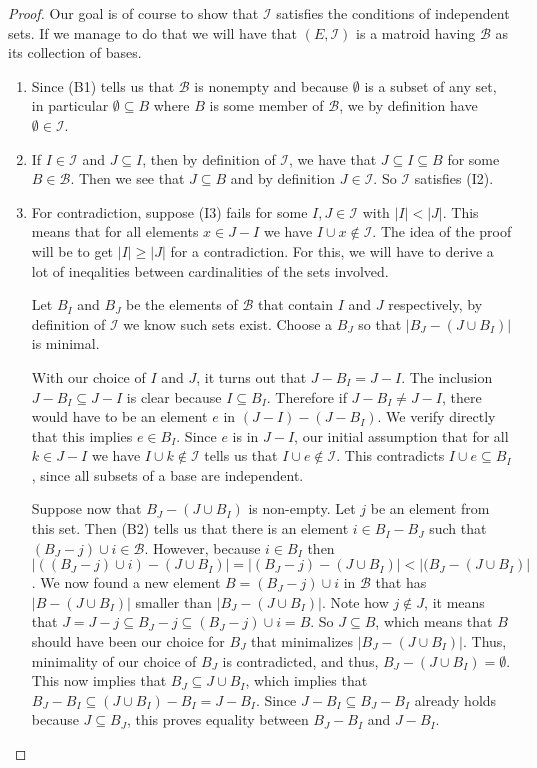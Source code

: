\begin{proof}
    Our goal is of course to show that $\mathcal{I}$ satisfies the conditions of independent sets. If we manage to do that we will have that $(E, \mathcal{I})$ is a matroid having $\mathcal{B}$ as its collection of bases.
    \begin{enumerate}
        \item Since (B1) tells us that $\mathcal{B}$ is nonempty and because $\emptyset$ is a subset of any set, in particular $\emptyset \subseteq B$ where $B$ is some member of $\mathcal{B}$, we by definition have $\emptyset \in \mathcal{I}$.
        
        \item If $I\in\mathcal{I}$ and $J\subseteq I$, then by definition of $\mathcal{I}$, we have that $J\subseteq I\subseteq B$ for some $B\in\mathcal{B}$. Then we see that $J\subseteq B$ and by definition  $J\in\mathcal{I}$. So $\mathcal{I}$ satisfies (I2).
        
        \item For contradiction, suppose (I3) fails for some $I,J\in\mathcal{I}$ with $|I|<|J|$. This means that for all elements $x\in J-I$ we have $I\cup x \notin \mathcal{I}$. The idea of the proof will be to get $|I|\geq|J|$ for a contradiction. For this, we will have to derive a lot of ineqalities between cardinalities of the sets involved.
        
        Let $B_I$ and $B_J$ be the elements of $\mathcal{B}$ that contain $I$ and $J$ respectively, by definition of $\mathcal{I}$ we know such sets exist. Choose a $B_J$ so that $|B_J - (J\cup B_I)|$ is minimal. 
    
        With our choice of $I$ and $J$, it turns out that $J-B_I = J-I$. 
        The inclusion $J- B_I \subseteq J - I$ is clear because $I \subseteq B_I$. Therefore if $J-B_I \neq J-I$, there would have to be an element $e$ in $(J-I)-(J-B_I)$. We verify directly that this implies $e \in B_I$. Since $e$ is in $J-I$, our initial assumption that for all $k \in J - I$ we have $I \cup k \notin \mathcal{I}$ tells us that $I\cup e\notin \mathcal{I}$. This contradicts $I\cup e\subseteq B_I$, since all subsets of a base are independent.

        Suppose now that $B_J-(J\cup B_I)$ is non-empty. Let $j$ be an element from this set. Then (B2) tells us that there is an element $i\in B_I-B_J$ such that $(B_J-j)\cup i \in\mathcal{B}$. However, because $i \in B_I$ then $|((B_J-j)\cup i)-(J\cup B_I)|=|(B_J-j)-(J\cup B_I)|<|(B_J-(J\cup B_I)|$. We now found a new element $B=(B_J-j)\cup i$ in $\mathcal{B}$ that has $|B-(J\cup B_I)|$ smaller than $|B_J-(J\cup B_I)|$. Note how $j\notin J$, it means that $J=J-j\subseteq B_J-j\subseteq (B_J-j)\cup i = B$. So $J\subseteq B$, which means that $B$ should have been our choice for $B_J$ that minimalizes $|B_J-(J\cup B_I)|$. Thus, minimality of our choice of $B_J$ is contradicted, and thus, $B_J-(J\cup B_I)=\emptyset$. This now implies that $B_J\subseteq J\cup B_I$, which implies that $B_J-B_I\subseteq (J\cup B_I)-B_I=J-B_I$. Since $J-B_I\subseteq B_J-B_I$ already holds because $J\subseteq B_J$, this proves equality between $B_J-B_I$ and $J-B_I$.


\end{enumerate}
\end{proof}
